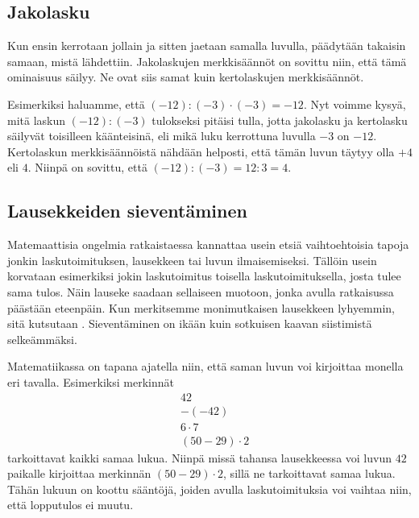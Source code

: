 \subsection*{Jakolasku}

        Kun ensin kerrotaan jollain ja sitten jaetaan samalla luvulla, päädytään takaisin samaan, mistä lähdettiin.  Jakolaskujen merkkisäännöt on sovittu niin, että tämä ominaisuus säilyy. Ne ovat siis samat kuin kertolaskujen merkkisäännöt.
    
    Esimerkiksi haluamme, että $(-12):(-3)\cdot (-3)=-12$. Nyt voimme kysyä, mitä laskun $(-12):(-3)$ tulokseksi pitäisi tulla, jotta jakolasku ja kertolasku säilyvät toisilleen käänteisinä, eli mikä luku kerrottuna luvulla $-3$ on $-12$. Kertolaskun merkkisäännöistä nähdään helposti, että tämän luvun täytyy olla $+4$ eli $4$. Niinpä on sovittu, että $(-12):(-3)=12:3=4$.



\subsection*{Lausekkeiden sieventäminen}

Matemaattisia ongelmia ratkaistaessa kannattaa usein etsiä vaihtoehtoisia tapoja jonkin laskutoimituksen, lausekkeen tai luvun ilmaisemiseksi. Tällöin usein korvataan esimerkiksi jokin laskutoimitus toisella laskutoimituksella, josta tulee sama tulos. Näin lauseke saadaan sellaiseen muotoon, jonka avulla ratkaisussa päästään eteenpäin. Kun merkitsemme monimutkaisen lausekkeen lyhyemmin, sitä kutsutaan . Sieventäminen on ikään kuin sotkuisen kaavan siistimistä selkeämmäksi.

Matematiikassa on tapana ajatella niin, että saman luvun voi kirjoittaa monella eri tavalla. Esimerkiksi merkinnät \begin{align*}
                & 42 \\ & -(-42) \\ & 6 \cdot 7 \\ & (50-29) \cdot 2                                                                                                      
                                                                                                                 \end{align*}
tarkoittavat kaikki samaa lukua. Niinpä missä tahansa lausekkeessa voi luvun $42$ paikalle kirjoittaa merkinnän $(50-29)\cdot 2$, sillä ne tarkoittavat samaa lukua. Tähän lukuun on koottu sääntöjä, joiden avulla laskutoimituksia voi vaihtaa niin, että lopputulos ei muutu.

